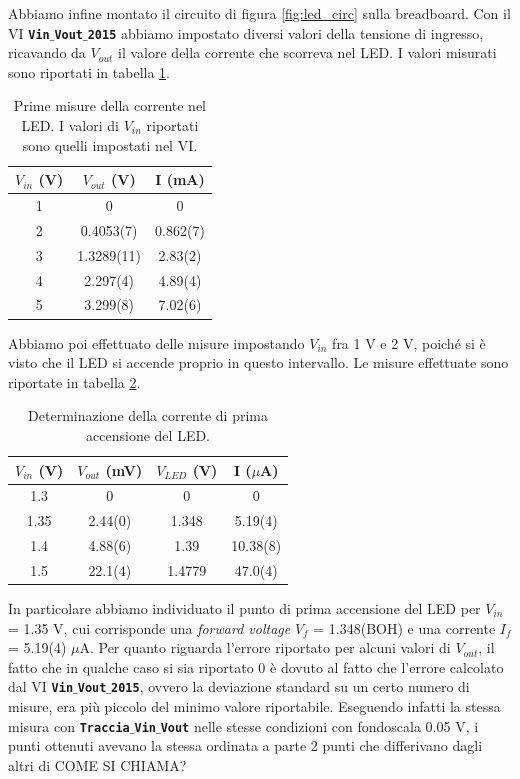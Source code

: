 \documentclass[journal, a4paper]{IEEEtran}
\begin{document}
Abbiamo infine montato il circuito di figura \ref{fig:led_circ} sulla breadboard. Con il VI \textbf{\texttt{Vin$\_$Vout$\_$2015}} abbiamo impostato diversi valori della tensione di ingresso, ricavando da $V_{out}$ il valore della corrente che scorreva nel LED. I valori misurati sono riportati in tabella \ref{tab:firstmis}.

\begin{table}[htp]
\centering
\caption{Prime misure della corrente nel LED. I valori di $V_{in}$ riportati sono quelli impostati nel VI.}
\label{tab:firstmis}
\begin{tabular}{|c|c|c|}
\hline 
$V_{in}$ (V)& $V_{out}$ (V)& I (mA)\\ 
\hline 
1 & 0 & 0 \\ 
\hline 
2 & 0.4053(7) & 0.862(7) \\ 
\hline 
3 & 1.3289(11) & 2.83(2) \\ 
\hline 
4 & 2.297(4) & 4.89(4) \\ 
\hline 
5 & 3.299(8) & 7.02(6) \\ 
\hline 
\end{tabular}
\end{table} 
 
Abbiamo poi effettuato delle misure impostando $V_{in}$ fra 1 V e 2 V, poiché si è visto che il LED si accende proprio in questo intervallo. Le misure effettuate sono riportate in tabella \ref{tab:secmis}.

\begin{table}[htp]
\centering
\caption{Determinazione della corrente di prima accensione del LED.}
\label{tab:secmis}
\begin{tabular}{|c|c|c|c|}
\hline 
$V_{in}$ (V)& $V_{out}$ (mV)& $V_{LED}$ (V) & I ($\mu$A)\\ 
\hline 
1.3 & 0 & 0 & 0 \\ 
\hline 
1.35 & 2.44(0) & 1.348 & 5.19(4) \\ 
\hline 
1.4 & 4.88(6) & 1.39 & 10.38(8) \\ 
\hline 
1.5 & 22.1(4) & 1.4779 & 47.0(4) \\ 
\hline 
\end{tabular} 
\end{table} 
 
In particolare abbiamo individuato il punto di prima accensione del LED per $V_{in}$ = 1.35 V, cui corrisponde una \textit{forward voltage} $V_f$ = 1.348(BOH) e una corrente $I_f$ = 5.19(4) $\mu$A. Per quanto riguarda l'errore riportato per alcuni valori di $V_{out}$, il fatto che in qualche caso si sia riportato 0 è dovuto al fatto che l'errore calcolato dal VI \textbf{\texttt{Vin$\_$Vout$\_$2015}}, ovvero la deviazione standard su un certo numero di misure, era più piccolo del minimo valore riportabile. Eseguendo infatti la stessa misura con \textbf{\texttt{Traccia$\_$Vin$\_$Vout}} nelle stesse condizioni con fondoscala 0.05 V, i punti ottenuti avevano la stessa ordinata a parte 2 punti che differivano dagli altri di COME SI CHIAMA?
\end{document}
